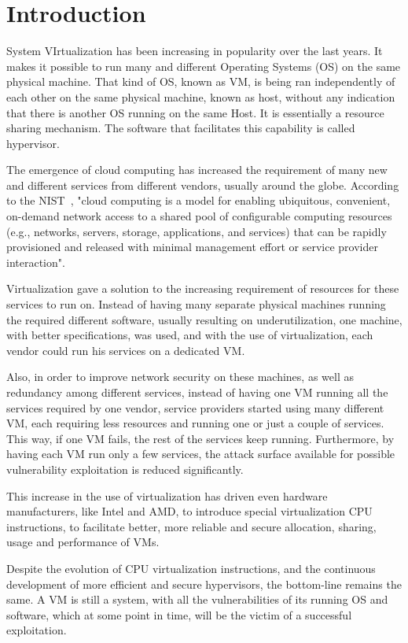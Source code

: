 \chapter{Introduction}\label{ch:intro}

System VIrtualization has been increasing in popularity over the last years. It makes it possible to run many and different Operating Systems (OS) on the same physical machine. That kind of \ac{OS}, known as \ac{VM}, is being ran independently of each other on the same physical machine, known as host, without any indication that there is another \ac{OS} running on the same Host. It is essentially a resource sharing mechanism. The software that facilitates this capability is called hypervisor.
\par The emergence of cloud computing has increased the requirement of many new and different services from different vendors, usually around the globe. According to the \ac{NIST}~\cite{mell2011nist}, "cloud computing is a model for enabling ubiquitous, convenient, on-demand network access to a shared pool of configurable computing resources (e.g., networks, servers, storage, applications, and services) that can be rapidly provisioned and released with minimal management effort or service provider interaction".  
\par Virtualization gave a solution to the increasing requirement of resources for these services to run on. Instead of having many separate physical machines running the required different software, usually resulting on underutilization, one machine, with better specifications, was used, and with the use of virtualization, each vendor could run his services on a dedicated \ac{VM}. 
\par Also, in order to improve network security on these machines, as well as redundancy among different services, instead of having one VM running all the services required by one vendor, service providers started using many different \ac{VM}, each requiring less resources and running one or just a couple of services. This way, if one VM fails, the rest of the services keep running. Furthermore, by having each \ac{VM} run only a few services, the attack surface available for possible vulnerability exploitation is reduced significantly.
\par This increase in the use of virtualization has driven even hardware manufacturers, like Intel and AMD, to introduce special virtualization \ac{CPU} instructions, to facilitate better, more reliable and secure allocation, sharing, usage and performance of \ac{VM}s. 
\par Despite the evolution of \ac{CPU} virtualization instructions, and the continuous development of more efficient and secure hypervisors, the bottom-line remains the same. A \ac{VM} is still a system, with all the vulnerabilities of its running \ac{OS} and software, which at some point in time, will be the victim of a successful exploitation. 

